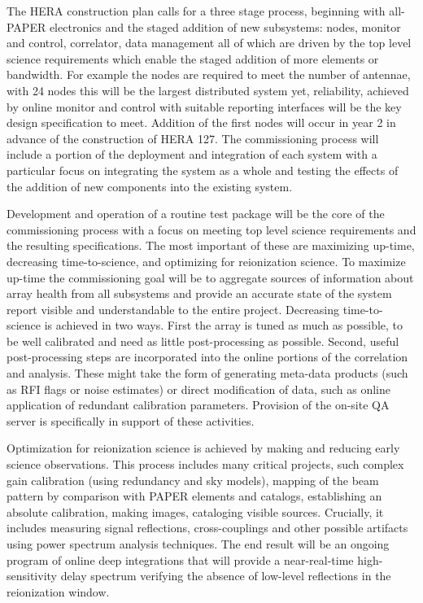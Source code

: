 \documentclass[preprint]{aastex}
\begin{document}
The HERA construction plan calls for a three stage process, beginning with all-PAPER electronics and the staged addition of new subsystems: nodes, monitor and control, correlator, data management all of which are driven by the top level science requirements which enable the staged addition of more elements or bandwidth. For example the nodes are required to meet the number of antennae, with 24 nodes this will be the largest distributed system yet, reliability, achieved by online monitor and control with suitable reporting interfaces will be the key design specification to meet.  Addition of the first nodes will occur in year 2 in advance of the construction of HERA 127. The commissioning process will include a portion of the deployment and integration of each system with a particular focus on integrating the system as a whole and testing the effects of the addition of new components into the existing system.  

Development and operation of a routine test package will be the core of the commissioning process with a focus on meeting top level science requirements and the resulting specifications.  The most important of these are maximizing up-time, decreasing time-to-science, and optimizing for reionization science.  To maximize up-time the commissioning goal will be to aggregate sources of information about array health from all subsystems and provide an accurate state of the system report visible and understandable to the entire project.  Decreasing time-to-science is achieved in two ways. First the array is tuned as much as possible, to be well calibrated and need as little post-processing as possible.  Second, useful post-processing steps are incorporated into the online portions of the correlation and analysis. These might take the form of generating meta-data products (such as RFI flags or noise estimates) or direct modification of data, such as online application of redundant calibration parameters.  Provision of the on-site QA server is specifically in support of these activities.

Optimization for reionization science is achieved by making and reducing early science observations. This process includes many critical projects, such complex gain calibration (using redundancy and sky models), mapping of the beam pattern by comparison with PAPER elements and catalogs, establishing an absolute calibration, making images, cataloging visible sources. Crucially, it includes measuring signal reflections, cross-couplings and other possible artifacts using power spectrum analysis techniques. The end result will be an ongoing program of online deep integrations that will provide a near-real-time high-sensitivity delay spectrum verifying the absence of low-level reflections in the reionization window.
\end{document}
